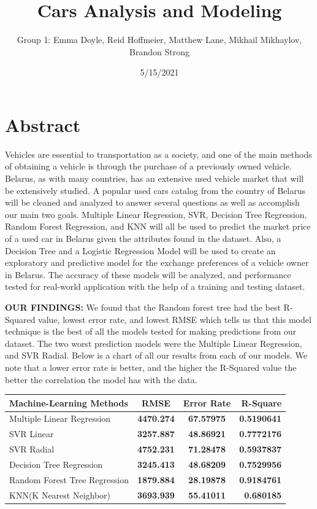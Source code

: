 \documentclass[
]{article}
\title{Cars Analysis and Modeling}
\author{Group 1: Emma Doyle, Reid Hoffmeier, Matthew Lane, Mikhail
Mikhaylov, Brandon Strong}
\date{5/15/2021}
\begin{document}
\maketitle

\hypertarget{abstract}{%
\section{Abstract}\label{abstract}}

Vehicles are essential to transportation as a society, and one of the
main methods of obtaining a vehicle is through the purchase of a
previously owned vehicle. Belarus, as with many countries, has an
extensive used vehicle market that will be extensively studied. A
popular used cars catalog from the country of Belarus will be cleaned
and analyzed to answer several questions as well as accomplish our main
two goals. Multiple Linear Regression, SVR, Decision Tree Regression,
Random Forest Regression, and KNN will all be used to predict the market
price of a used car in Belarus given the attributes found in the
dataset. Also, a Decision Tree and a Logistic Regression Model will be
used to create an exploratory and predictive model for the exchange
preferences of a vehicle owner in Belarus. The accuracy of these models
will be analyzed, and performance tested for real-world application with
the help of a training and testing dataset.

\textbf{OUR FINDINGS:} We found that the Random forest tree had the best
R-Squared value, lowest error rate, and lowest RMSE which tells us that
this model technique is the best of all the models tested for making
predictions from our dataset. The two worst prediction models were the
Multiple Linear Regression, and SVR Radial. Below is a chart of all our
results from each of our models. We note that a lower error rate is
better, and the higher the R-Squared value the better the correlation
the model has with the data.

\begin{longtable}[]{@{}lccr@{}}
\toprule
Machine-Learning Methods & RMSE & Error Rate & R-Square\tabularnewline
\midrule
\endhead
Multiple Linear Regression & \textbf{4470.274} & \textbf{67.57975} &
\textbf{0.5190641}\tabularnewline
SVR Linear & \textbf{3257.887} & \textbf{48.86921} &
\textbf{0.7772176}\tabularnewline
SVR Radial & \textbf{4752.231} & \textbf{71.28478} &
\textbf{0.5937837}\tabularnewline
Decision Tree Regression & \textbf{3245.413} & \textbf{48.68209} &
\textbf{0.7529956}\tabularnewline
Random Forest Tree Regression & \textbf{1879.884} & \textbf{28.19878} &
\textbf{0.9184761}\tabularnewline
KNN(K Nearest Neighbor) & \textbf{3693.939} & \textbf{55.41011} &
\textbf{0.680185}\tabularnewline
\bottomrule
\end{longtable}
\end{document}
